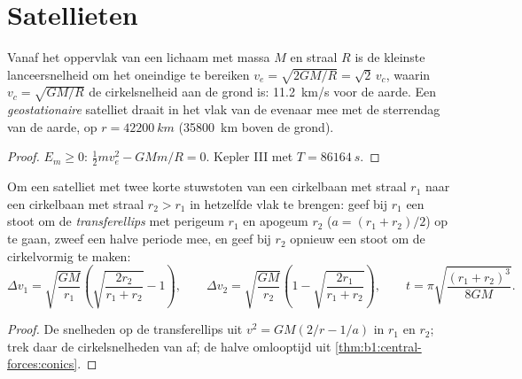 \section{Satellieten}

\begin{proposition}\label{prop:b1:central-forces:escape}
Vanaf het oppervlak van een lichaam met massa $M$ en straal $R$ is de kleinste
lanceersnelheid om het oneindige te bereiken $v_e = \sqrt{2GM/R} = \sqrt2\,v_c$,
waarin $v_c = \sqrt{GM/R}$ de cirkelsnelheid aan de grond is:
\qty{11.2}{km/s} voor de aarde. Een \emph{geostationaire} satelliet draait
in het vlak van de evenaar mee met de sterrendag van de aarde, op
$r = \qty{42200}{km}$ (\qty{35800}{km} boven de grond).
\end{proposition}

\begin{proof}
$E_m \geq 0$: $\tfrac12 mv_e^2 - GMm/R = 0$. Kepler III met $T = \qty{86164}{s}$.
\end{proof}

\begin{proposition}\label{prop:b1:central-forces:hohmann}
Om een satelliet met twee korte stuwstoten van een cirkelbaan met straal $r_1$
naar een cirkelbaan met straal $r_2 > r_1$ in hetzelfde vlak te brengen: geef bij $r_1$
een stoot om de \emph{transferellips} met perigeum $r_1$ en apogeum $r_2$
($a = (r_1 + r_2)/2$) op te gaan, zweef een halve periode mee, en geef bij $r_2$
opnieuw een stoot om de  cirkelvormig te maken:
\[
\Delta v_1 = \sqrt{\frac{GM}{r_1}}\left(\sqrt{\frac{2r_2}{r_1 + r_2}} - 1\right),
\qquad
\Delta v_2 = \sqrt{\frac{GM}{r_2}}\left(1 - \sqrt{\frac{2r_1}{r_1 + r_2}}\right),
\qquad
t = \pi\sqrt{\frac{(r_1 + r_2)^3}{8GM}} .
\]
\end{proposition}

\begin{proof}
De snelheden op de transferellips uit $v^2 = GM(2/r - 1/a)$ in $r_1$ en
$r_2$; trek daar de cirkelsnelheden van af; de halve omlooptijd uit
\cref{thm:b1:central-forces:conics}.
\end{proof}


